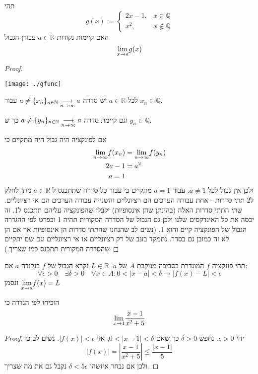 \documentclass{article}
\begin{document}
\begin{exercise}
תהי 
\[g(x):=\begin{cases} 2x-1, & x\in\mathbb{Q} \\ x^2 , & x\not\in \mathbb{Q}\end{cases}\]
האם קיימות נקודות 
$a\in\mathbb{R}$
עבורן הגבול 
\[\underset{x\rightarrow a}{\lim} g(x)\]
\end{exercise}

\begin{proof}

\begin{center}
\texttt{[image: ./gfunc]}
\end{center}


לכל 
$a\in\mathbb{R}$
יש סדרה
$a\neq \{x_n\}_{n\in\mathbb{N}} \underset{n\rightarrow\infty}{\longrightarrow} a$ 
עבור 
$x_n\in\mathbb{Q}$.
\par\noindent
וגם קיימת סדרה 
$a\neq \{y_n\}_{n\in\mathbb{N}}\underset{n\rightarrow\infty}{\longrightarrow} a$
כך ש 
$y_n\in\mathbb{Q}$.
\par\noindent 
אם לפונקציה היה גבול היה מתקיים כי 
\begin{align*}
\underset{n\rightarrow\infty}{\lim} f(x_n) &= \underset{n\rightarrow\infty}{\lim} f(y_n)\\
2a-1 &= a^2 \\ 
a=1
\end{align*}
ולכן אין גבול לכל 
$a\neq 1$.
עבור 
$a=1$
מתקיים כי עבור כל סדרה שתתכנס ל 
$a\in\mathbb{R}$
ניתן לחלק ל2 תתי סדרות - אחת עבורה הערכים הם רציונליים והשנייה עבורה הערכים הם אי רציונליים. שתי התתי סדרות האלה (בהינתן שהן אינסופיות) יקבלו שהפונקציה עליהם תתכנס ל1. זה יכסה את כל האינדקסים שלנו ולכן גם הגבול של הסדרה המקורית תהיה 1 ובפרט לפי ההגדרה הגבול של הפונקציה קיים והוא 1. (נשים לב שהנחנו שהתתי סדרות הן אינסופיות אך אם הן לא זה כמובן גם בסדר. נתמקד בזנב של רק רציונליים או אי רציונליים וגם שם יתקיים שהסדרה המקורית תתכנס כמו שצריך.)
\end{proof}

\begin{definition}
תהי פונקציה
$f$
המוגדרת בסביבה מנוקבת 
$A$
של 
$a$.
$L\in\mathbb{R}$
נקרא הגבול של 
$f$ 
בנקודה 
$a$
אם:
\[\forall\epsilon>0 \quad \exists \delta>0\quad\forall x\in A: 0<|x-a|<\delta \rightarrow |f(x)-L|<\epsilon\]
ונסמן 
$\underset{x\rightarrow a}{\lim} f(x)=L$
\end{definition}
\begin{comment}
גבול לפי קושי שקול לגבול לפי היינה 
\end{comment}

\begin{exercise}
הוכיחו לפי הגדרה כי 
\[\underset{x\rightarrow1}{\lim} \frac{x-1}{x^2+5}\]
\end{exercise}

\begin{proof}
יהי 
$\epsilon>0 $.
נחפש 
$\delta>0$
כך שאם 
$0<|x-1|<\delta$,
אזי 
$|f(x)|<\epsilon$.
נשים לב כי 
\[|f(x)| = \left|\frac{x-1}{x^2+5}\right| \leq \frac{|x-1|}{5}\]
ולכן אם נבחר איזשהו 
$\delta<5\epsilon$
נקבל גם את מה שצריך.
\end{proof}
\end{document}

